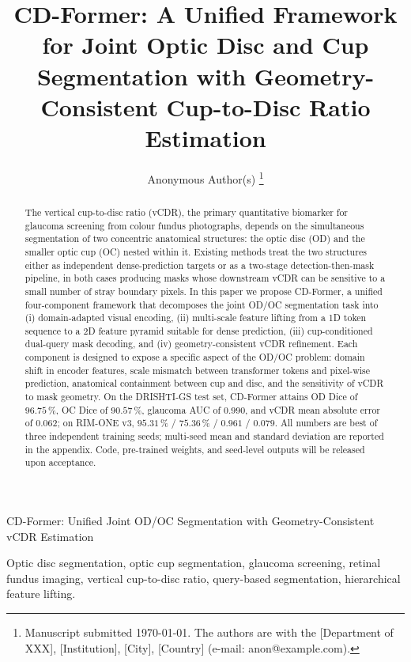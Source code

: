 \documentclass[10pt,journal,twocolumn]{IEEEtran}
\begin{document}
\title{CD-Former: A Unified Framework for Joint Optic Disc and Cup Segmentation with Geometry-Consistent Cup-to-Disc Ratio Estimation}

\author{Anonymous Author(s)%
\thanks{Manuscript submitted \today. The authors are with the [Department of XXX], [Institution], [City], [Country] (e-mail: anon@example.com).}}

%
{CD-Former: Unified Joint OD/OC Segmentation with Geometry-Consistent vCDR Estimation}

\maketitle

\begin{abstract}
The vertical cup-to-disc ratio (vCDR), the primary quantitative biomarker for glaucoma screening from colour fundus photographs, depends on the simultaneous segmentation of two concentric anatomical structures: the optic disc (OD) and the smaller optic cup (OC) nested within it. Existing methods treat the two structures either as independent dense-prediction targets or as a two-stage detection-then-mask pipeline, in both cases producing masks whose downstream vCDR can be sensitive to a small number of stray boundary pixels. In this paper we propose CD-Former, a unified four-component framework that decomposes the joint OD/OC segmentation task into (i) domain-adapted visual encoding, (ii) multi-scale feature lifting from a 1D token sequence to a 2D feature pyramid suitable for dense prediction, (iii) cup-conditioned dual-query mask decoding, and (iv) geometry-consistent vCDR refinement. Each component is designed to expose a specific aspect of the OD/OC problem: domain shift in encoder features, scale mismatch between transformer tokens and pixel-wise prediction, anatomical containment between cup and disc, and the sensitivity of vCDR to mask geometry. On the DRISHTI-GS test set, CD-Former attains OD Dice of $96.75\,\%$, OC Dice of $90.57\,\%$, glaucoma AUC of $0.990$, and vCDR mean absolute error of $0.062$; on RIM-ONE v3, $95.31\,\%$ / $75.36\,\%$ / $0.961$ / $0.079$. All numbers are best of three independent training seeds; multi-seed mean and standard deviation are reported in the appendix. Code, pre-trained weights, and seed-level outputs will be released upon acceptance.
\end{abstract}

\begin{IEEEkeywords}
Optic disc segmentation, optic cup segmentation, glaucoma screening, retinal fundus imaging, vertical cup-to-disc ratio, query-based segmentation, hierarchical feature lifting.
\end{IEEEkeywords}
\end{document}
